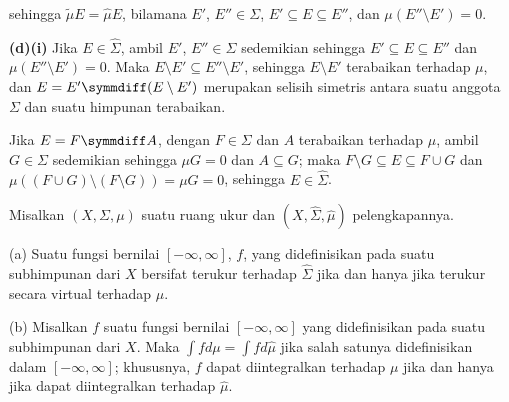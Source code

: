 {

\noindent sehingga $\tilde\mu E=\hat\mu E$, bilamana
$E'$, $E''\in\Sigma$, $E'\subseteq E\subseteq E''$, dan
$\mu(E''\setminus E')=0$.

\medskip

{\bf (d)(i)} Jika $E\in\hat\Sigma$, ambil $E'$, $E''\in\Sigma$
sedemikian sehingga $E'\subseteq E\subseteq E''$ dan
$\mu(E''\setminus E')=0$. Maka
$E\setminus E'\subseteq E''\setminus E'$, sehingga $E\setminus E'$
terabaikan terhadap $\mu$, dan $E=E'\symmdiff(E\setminus E')$ merupakan selisih
simetris antara suatu anggota $\Sigma$ dan suatu himpunan terabaikan.

\medskip

 Jika $E=F\symmdiff A$, dengan $F\in\Sigma$ dan $A$
terabaikan terhadap $\mu$, ambil $G\in\Sigma$ sedemikian sehingga $\mu G=0$
dan $A\subseteq G$; maka $F\setminus G\subseteq E\subseteq F\cup G$
dan $\mu((F\cup G)\setminus(F\setminus G))=\mu G=0$, sehingga
$E\in\hat\Sigma$.
}%

 Misalkan $(X,\Sigma,\mu)$ suatu ruang ukur
dan $(X,\hat\Sigma,\hat\mu)$ pelengkapannya.

(a) Suatu fungsi bernilai $[-\infty,\infty]$, $f$, yang didefinisikan
pada suatu subhimpunan dari $X$ bersifat terukur terhadap $\hat\Sigma$ jika dan hanya
jika terukur secara virtual terhadap $\mu$.

(b) Misalkan $f$ suatu fungsi bernilai $[-\infty,\infty]$ yang
didefinisikan pada suatu subhimpunan dari $X$. Maka
$\int fd\mu=\int fd\hat\mu$ jika salah satunya didefinisikan dalam
$[-\infty,\infty]$; khususnya, $f$ dapat diintegralkan terhadap $\mu$ jika dan hanya
jika dapat diintegralkan terhadap $\hat\mu$.

